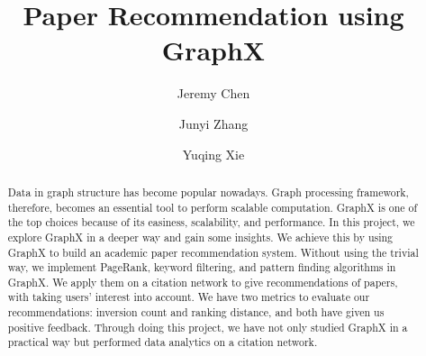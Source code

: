 \documentclass[sigconf]{acmart}
\begin{document}
\title{Paper Recommendation using GraphX}

\author{Jeremy Chen}

\author{Junyi Zhang}

\author{Yuqing Xie}

\renewcommand\footnotetextcopyrightpermission[1]{}
\pagestyle{plain}


\begin{abstract}
Data in graph structure has become popular nowadays.
%
Graph processing framework, therefore, becomes an essential tool to perform scalable computation.
%
GraphX is one of the top choices because of its easiness, scalability, and performance.
%
In this project, we explore GraphX in a deeper way and gain some insights.
%
We achieve this by using GraphX to build an academic paper recommendation system.
%
Without using the trivial way, we implement PageRank, keyword filtering, and pattern finding algorithms in GraphX.
%
We apply them on a citation network to give recommendations of papers, with taking users' interest into account.
%
We have two metrics to evaluate our recommendations: inversion count and ranking distance, and both have given us positive feedback.
%
Through doing this project, we have not only studied GraphX in a practical way but performed data analytics on a citation network.
%
\end{abstract}

\maketitle













\end{document}
